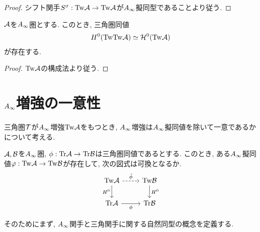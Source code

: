 \documentclass[uplatex, a4paper, 14Q, dvipdfmx]{jsarticle}
\begin{document}
\begin{proof}
  シフト関手$S^\sigma : \mathrm{Tw}\mathcal{A} \to \mathrm{Tw}\mathcal{A}$が$A_{\infty}$擬同型であることより従う. 
\end{proof}

\begin{lemma}
  $\mathcal{A}$を$A_{\infty}$圏とする. 
  このとき, 三角圏同値 
  \begin{align*}
    H^0(\mathrm{Tw}\mathrm{Tw}\mathcal{A}) \simeq \mathcal{H}^0(\mathrm{Tw}\mathcal{A})
  \end{align*}
  が存在する.
\end{lemma}

\begin{proof}
  $\mathrm{Tw}\mathcal{A}$の構成法より従う.
\end{proof}

\section{\texorpdfstring{$A_{\infty}$}{Ainf}増強の一意性}

三角圏$\mathcal{T}$が$A_{\infty}$増強$\mathrm{Tw}\mathcal{A}$をもつとき, $A_{\infty}$増強は$A_{\infty}$擬同値を除いて一意であるかについて考える. 

\begin{question}
  $\mathcal{A}, \mathcal{B}$を$A_{\infty}$圏, $\phi : \mathrm{Tr}\mathcal{A} \to \mathrm{Tr}\mathcal{B}$は三角圏同値であるとする. 
  このとき, ある$A_{\infty}$擬同値$\varphi : \mathrm{Tw}\mathcal{A} \to \mathrm{Tw}\mathcal{B}$が存在して, 次の図式は可換となるか. 
  \[\begin{tikzcd}
    \Tw\A & \Tw\B \\
    \Tr\A & \Tr\B
    \arrow["\tilphi", dashed, from=1-1, to=1-2]
    \arrow["{H^0}", from=1-2, to=2-2]
    \arrow["{H^0}"', from=1-1, to=2-1]
    \arrow["\phi"', from=2-1, to=2-2]
  \end{tikzcd}\]
\end{question}

そのためにまず, $A_{\infty}$関手と三角関手に関する自然同型の概念を定義する.
\end{document}
